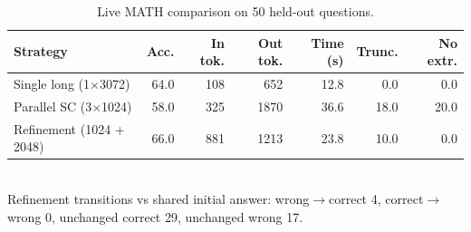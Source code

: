 \begin{table}[t]
\centering
\scriptsize
\begin{tabular}{lrrrrrr}
\toprule
Strategy & Acc. & In tok. & Out tok. & Time (s) & Trunc. & No extr. \\
\midrule
Single long (1$\times$3072) & 64.0 & 108 & 652 & 12.8 & 0.0 & 0.0 \\
Parallel SC (3$\times$1024) & 58.0 & 325 & 1870 & 36.6 & 18.0 & 20.0 \\
Refinement (1024 + 2048) & 66.0 & 881 & 1213 & 23.8 & 10.0 & 0.0 \\
\bottomrule
\end{tabular}
\\[2pt]{\footnotesize Refinement transitions vs shared initial answer: wrong$\to$correct 4, correct$\to$wrong 0, unchanged correct 29, unchanged wrong 17.}
\caption{Live MATH comparison on 50 held-out questions.}
\label{tab:t3-live}
\end{table}
